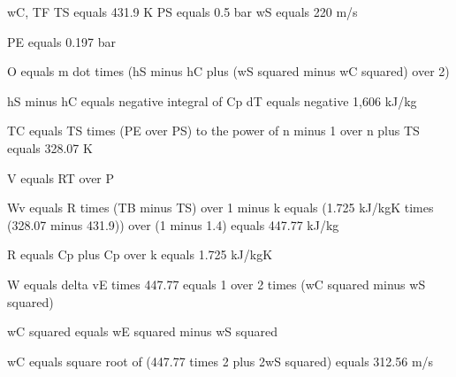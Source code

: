 wC, TF
TS equals 431.9 K
PS equals 0.5 bar
wS equals 220 m/s

PE equals 0.197 bar

O equals m dot times (hS minus hC plus (wS squared minus wC squared) over 2)

hS minus hC equals negative integral of Cp dT equals negative 1,606 kJ/kg

TC equals TS times (PE over PS) to the power of n minus 1 over n plus TS equals 328.07 K

V equals RT over P

Wv equals R times (TB minus TS) over 1 minus k equals (1.725 kJ/kgK times (328.07 minus 431.9)) over (1 minus 1.4) equals 447.77 kJ/kg

R equals Cp plus Cp over k equals 1.725 kJ/kgK

W equals delta vE times 447.77 equals 1 over 2 times (wC squared minus wS squared) 

wC squared equals wE squared minus wS squared

wC equals square root of (447.77 times 2 plus 2wS squared) equals 312.56 m/s